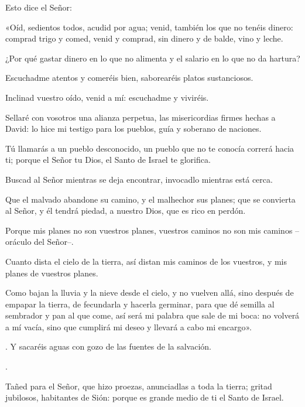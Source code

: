 \begin{readprose}
Esto dice el Señor: 
	
«Oíd, sedientos todos, acudid por agua; 
   venid, también los que no tenéis dinero: 
   comprad trigo y comed, venid y comprad, 
   sin dinero y de balde, vino y leche. 

¿Por qué gastar dinero en lo que no alimenta 
   y el salario en lo que no da hartura? 

Escuchadme atentos y comeréis bien, 
   saborearéis platos sustanciosos. 

Inclinad vuestro oído, venid a mí: 
   escuchadme y viviréis. 

Sellaré con vosotros una alianza perpetua, 
   las misericordias firmes hechas a David: 
   lo hice mi testigo para los pueblos, 
   guía y soberano de naciones. 

Tú llamarás a un pueblo desconocido, 
   un pueblo que no te conocía correrá hacia ti; 
   porque el Señor tu Dios, 
   el Santo de Israel te glorifica. 

Buscad al Señor mientras se deja encontrar, 
   invocadlo mientras está cerca. 

Que el malvado abandone su camino, 
   y el malhechor sus planes; 
   que se convierta al Señor, y él tendrá piedad, 
   a nuestro Dios, que es rico en perdón. 

Porque mis planes no son vuestros planes, 
   vuestros caminos no son mis caminos 
   –oráculo del Señor–. 

Cuanto dista el cielo de la tierra, 
   así distan mis caminos de los vuestros, 
   y mis planes de vuestros planes. 

Como bajan la lluvia y la nieve desde el cielo, 
   y no vuelven allá, sino después de empapar la tierra, 
   de fecundarla y hacerla germinar, 
   para que dé semilla al sembrador 
   y pan al que come, 
   así será mi palabra que sale de mi boca: 
   no volverá a mí vacía, 
   sino que cumplirá mi deseo 
   y llevará a cabo mi encargo».
\end{readprose}



 


\begin{psbody}
.
Y sacaréis aguas con gozo
de las fuentes de la salvación. 

. 

Tañed para el Señor, que hizo proezas,
anunciadlas a toda la tierra;
gritad jubilosos, habitantes de Sión:
porque es grande medio de ti el Santo de Israel. 
\end{psbody}

